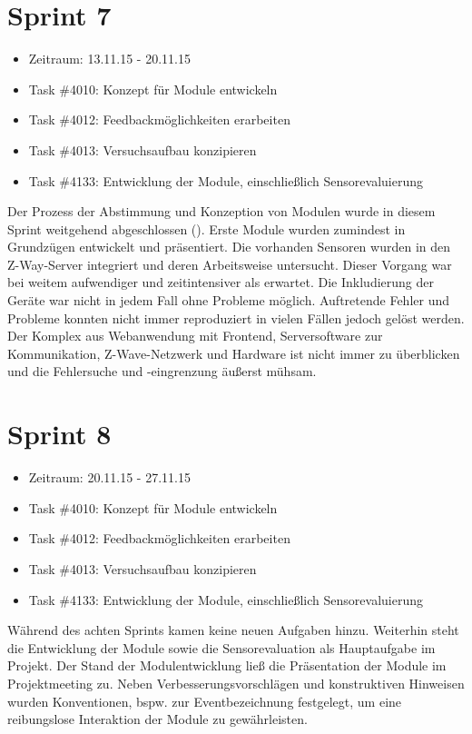 \documentclass[12pt, oneside, smallheadings]{scrbook}
\begin{document}
\section{Sprint 7}
\begin{itemize}
	\item Zeitraum: 13.11.15 - 20.11.15 \newline
	\item Task \#4010: Konzept für Module entwickeln
	\item Task \#4012: Feedbackmöglichkeiten erarbeiten
	\item Task \#4013: Versuchsaufbau konzipieren
	\item Task \#4133: Entwicklung der Module, einschließlich Sensorevaluierung\\
\end{itemize}
\noindent
Der Prozess der Abstimmung und Konzeption von Modulen wurde in diesem Sprint weitgehend abgeschlossen (). Erste Module wurden zumindest in Grundzügen entwickelt und präsentiert. Die vorhanden Sensoren wurden in den Z-Way-Server integriert und deren Arbeitsweise untersucht. Dieser Vorgang war bei weitem aufwendiger und zeitintensiver als erwartet. Die Inkludierung der Geräte war nicht in jedem Fall ohne Probleme möglich. Auftretende Fehler und Probleme konnten nicht immer reproduziert in vielen Fällen jedoch gelöst werden. Der Komplex aus Webanwendung mit Frontend, Serversoftware zur Kommunikation, Z-Wave-Netzwerk und Hardware ist nicht immer zu überblicken und die Fehlersuche und -eingrenzung äußerst mühsam.

\section{Sprint 8}
\begin{itemize}
	\item Zeitraum: 20.11.15 - 27.11.15 \newline
	\item Task \#4010: Konzept für Module entwickeln
	\item Task \#4012: Feedbackmöglichkeiten erarbeiten
	\item Task \#4013: Versuchsaufbau konzipieren
	\item Task \#4133: Entwicklung der Module, einschließlich Sensorevaluierung\\
\end{itemize}
\noindent
Während des achten Sprints kamen keine neuen Aufgaben hinzu. Weiterhin steht die Entwicklung der Module sowie die Sensorevaluation als Hauptaufgabe im Projekt. Der Stand der Modulentwicklung ließ die Präsentation der Module im Projektmeeting zu. Neben Verbesserungsvorschlägen und konstruktiven Hinweisen wurden Konventionen, bspw. zur Eventbezeichnung festgelegt, um eine reibungslose Interaktion der Module zu gewährleisten.
\end{document}
